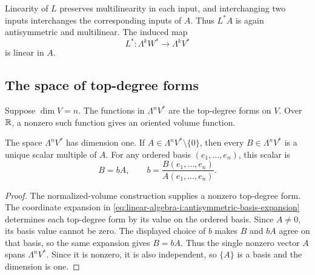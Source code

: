 Linearity of \(L\) preserves multilinearity in each input, and interchanging
two inputs interchanges the corresponding inputs of \(A\). Thus \(L^*A\)
is again antisymmetric and multilinear. The induced map
\[
  L^*:\Lambda^k W^*\longrightarrow\Lambda^k V^*
\]
is linear in \(A\).

\subsection{The space of top-degree forms}

Suppose \(\dim V=n\). The functions in \(\Lambda^n V^*\) are the
top-degree forms on \(V\). Over \(\mathbb{R}\), a nonzero such function gives
an oriented volume function.

\begin{proposition}
  \label{thm:linear-algebra-i:top-degree-forms}
  The space \(\Lambda^n V^*\) has dimension one. If
  \(A\in\Lambda^n V^*\setminus\{0\}\), then every
  \(B\in\Lambda^n V^*\) is a unique scalar multiple of \(A\).
  For any ordered basis \((e_1,\ldots,e_n)\), this scalar is
  \[
    B=bA,\qquad b=\frac{B(e_1,\ldots,e_n)}{A(e_1,\ldots,e_n)}.
  \]
\end{proposition}

\begin{proof}
  The normalized-volume construction supplies a nonzero top-degree form.
  The coordinate expansion in
  \autoref{eq:linear-algebra-i:antisymmetric-basis-expansion}
  determines each top-degree form by its value on the ordered basis.
  Since \(A\ne0\), its basis value cannot be zero. The displayed choice
  of \(b\) makes \(B\) and \(bA\) agree on that basis, so the same
  expansion gives \(B=bA\). Thus the single nonzero vector \(A\)
  spans \(\Lambda^n V^*\). Since it is nonzero, it is also independent,
  so \(\{A\}\) is a basis and the dimension is one.
\end{proof}
